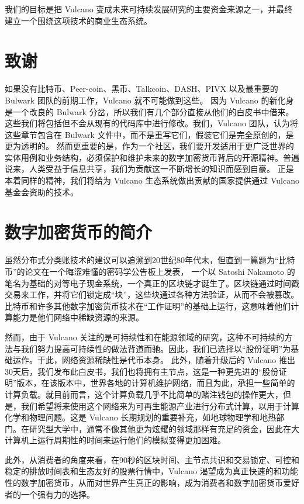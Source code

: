 \documentclass[A4paper, 12pt]{article}
\begin{document}
我们的目标是把 Vulcano 变成未来可持续发展研究的主要资金来源之一，并最终建立一个围绕这项技术的商业生态系统。

\section{致谢}
如果没有比特币、Peer-coin、黑币、Talkcoin、DASH、PIVX 以及最重要的 Bulwark 团队的前期工作，Vulcano 就不可能做到这些。  因为 Vulcano 的新化身是一个改良的 Bulwark 分岔，所以我们有几个部分直接从他们的白皮书中借来。这些我们将包括但不会从现有的代码库中进行修改。我们，Vulcano 团队，认为将这些章节包含在 Bulwark 文件中，而不是重写它们，假装它们是完全原创的，是更为透明的。  然而更重要的是，作为一个社区，我们要开发适用于更广泛世界的实体用例和业务结构，必须保护和维护未来的数字加密货币背后的开源精神。普遍说来，人类受益于信息共享，我们为贡献这一不断增长的知识而感到自豪。        正是本着同样的精神，我们将给为 Vulcano 生态系统做出贡献的国家提供通过 Vulcano 基金会资助的技术。

\section{数字加密货币的简介}
虽然分布式分类账技术的建议可以追溯到20世纪80年代末，但直到一篇题为“比特币”的论文在一个晦涩难懂的密码学公告板上发表，  一个以 Satoshi Nakamoto 的笔名为基础的对等电子现金系统，一个真正的区块链才诞生了。区块链通过时间戳交易来工作，并将它们锁定成“块”，这些块通过各种方法验证，从而不会被篡改。比特币和许多其他数字加密货币技术在“工作证明”的基础上运行，这意味着他们计算能力是他们网络中稀缺资源的来源。

然而，由于 Vulcano 关注的是可持续性和在能源领域的研究，这种不可持续的方法与我们努力提高可持续性的做法背道而驰。因此，我们已选择以“股份证明”为基础运作。于此，网络资源稀缺性是代币本身。  此外，随着升级后的 Vulcano 推出30天后，我们发布此白皮书，我们也将拥有主节点，这是一种更先进的“股份证明”版本，在该版本中，世界各地的计算机维护网络，而且为此，承担一些简单的计算负载。就目前而言，这个计算负载几乎不比简单的赌注钱包的操作更大，但是，我们希望将来使用这个网络来为可再生能源产业进行分布式计算，以用于计算化学和物理问题。这是 Vulcano 长期规划的重要补充，如地球物理学和地热部门。在研究型大学中，通常不像其他更为炫耀的领域那样有充足的资金，因此在大计算机上运行周期性的时间来运行他们的模拟变得更加困难。 

此外，从消费者的角度来看，在90秒的区块时间、主节点共识和交易锁定、可控和稳定的排放时间表和生态友好的股票行情中，Vulcano 渴望成为真正快速的和功能性的数字加密货币，从而对世界产生真正的影响，成为消费者和数字加密货币爱好者的一个强有力的选择。
\end{document}
